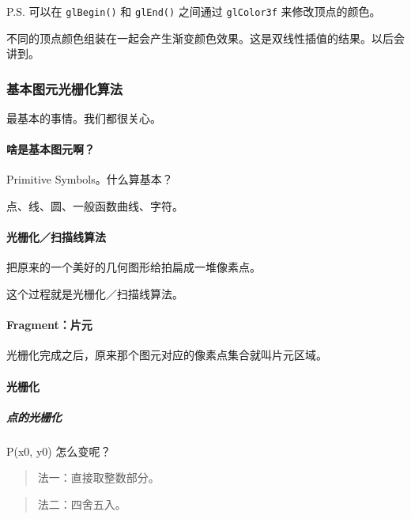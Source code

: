 \documentclass[
]{article}
\begin{document}
P.S. 可以在 \texttt{glBegin()} 和 \texttt{glEnd()} 之间通过
\texttt{glColor3f} 来修改顶点的颜色。

不同的顶点颜色组装在一起会产生渐变颜色效果。这是双线性插值的结果。以后会讲到。

\hypertarget{header-n185}{%
\subsubsection{基本图元光栅化算法}\label{header-n185}}

最基本的事情。我们都很关心。

\hypertarget{header-n187}{%
\paragraph{啥是基本图元啊？}\label{header-n187}}

Primitive Symbols。什么算基本？

点、线、圆、一般函数曲线、字符。

\hypertarget{header-n190}{%
\paragraph{光栅化／扫描线算法}\label{header-n190}}

把原来的一个美好的几何图形给拍扁成一堆像素点。

这个过程就是光栅化／扫描线算法。

\hypertarget{header-n193}{%
\paragraph{Fragment：片元}\label{header-n193}}

光栅化完成之后，原来那个图元对应的像素点集合就叫片元区域。

\hypertarget{header-n195}{%
\paragraph{光栅化}\label{header-n195}}

\hypertarget{header-n196}{%
\subparagraph{点的光栅化}\label{header-n196}}

P(x0, y0) 怎么变呢？

\begin{quote}
法一：直接取整数部分。
\end{quote}

\begin{quote}
法二：四舍五入。
\end{quote}
\end{document}
